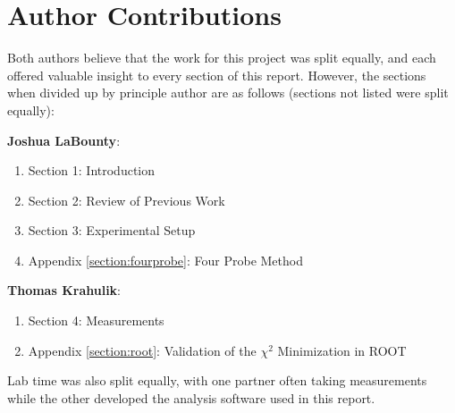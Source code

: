 \documentclass[%
 reprint,
 amsmath,amssymb,
 aps,
 pra,
]{revtex4-1}
\begin{document}
\section{Author Contributions}

Both authors believe that the work for this project was split equally, and each offered valuable insight to every section of this report. However, the sections when divided up by principle author are as follows (sections not listed were split equally):

\noindent \textbf{Joshua LaBounty}:
\begin{enumerate}
	\item Section 1: Introduction
	\item Section 2: Review of Previous Work
	\item Section 3: Experimental Setup
	\item Appendix \ref{section:fourprobe}: Four Probe Method
\end{enumerate}

\noindent \textbf{Thomas Krahulik}:
\begin{enumerate}
	\item Section 4: Measurements
	\item Appendix \ref{section:root}: Validation of the $\chi^2$ Minimization in ROOT
\end{enumerate}

\noindent Lab time was also split equally, with one partner often taking measurements while the other developed the analysis software used in this report.
\end{document}
